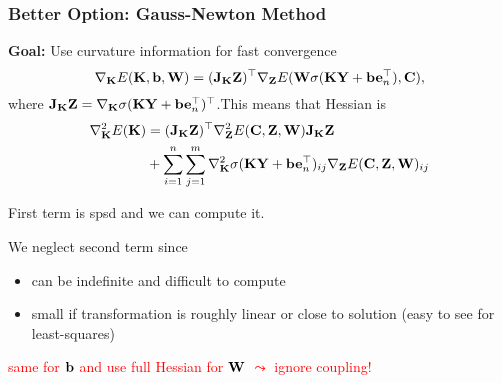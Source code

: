 \documentclass[12pt,fleqn,handout]{beamer}
\begin{document}
\begin{frame}
	\frametitle{Better Option: Gauss-Newton Method}
	
	\textbf{Goal:} Use curvature information for fast convergence
	$$
	\nabla_{{\bf K}} E({\bf K},{\bf b},{\bf W}) =  ({\bf J}_{\bf K} {\bf Z})^\top \nabla_{\bf Z} E({\bf W}\sigma({\bf K} {\bf Y}+{\bf b}{\bf e}_n^\top),{\bf C}),
	$$
	where ${\bf J}_{\bf K} {\bf Z} = \nabla_{{\bf K}} \sigma({\bf K} {\bf Y}+{\bf b}{\bf e}_n^\top)^\top$.\pause This means that Hessian is
	\begin{equation*}
		\begin{split}
	\nabla_{{\bf K}}^2 E({\bf K}) &  = ({\bf J}_{{\bf K}}{\bf Z})^\top  \nabla_{\bf Z}^2 E({\bf C},{\bf Z},{\bf W}) {\bf J}_{{\bf K}}{\bf Z}\\
	 & + \sum_{i=1}^{n}\sum_{j=1}^{m} \nabla_{{\bf K}}^2 \sigma({\bf K} {\bf Y}+{\bf b}{\bf e}_n^\top)_{ij} \nabla_{\bf Z} E({\bf C},{\bf Z},{\bf W})_{ij}
		\end{split}
	\end{equation*}
	
	First term is spsd and we can compute it.
	
	\pause
	
	We neglect second term since
	\begin{itemize}
		\item can be indefinite and difficult to compute
		\item small if transformation is roughly linear or close to solution (easy to see for least-squares)
	\end{itemize}
	\begin{center}
		\textcolor{red}{same for ${\bf b}$ and use full Hessian for ${\bf W}$ $\leadsto$ ignore coupling!}
	\end{center}	
\end{frame}
\end{document}
